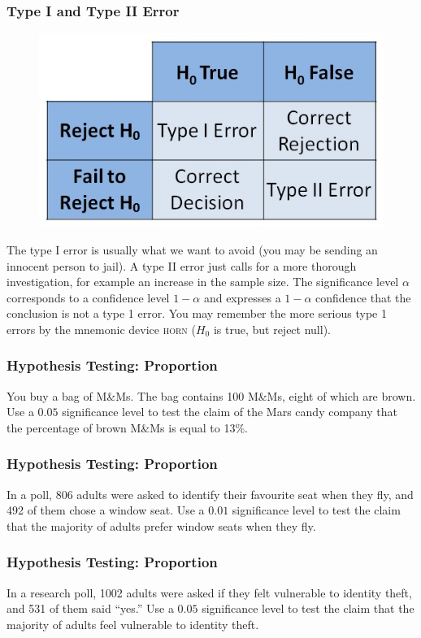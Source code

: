 \documentclass[xcolor=dvipsnames]{beamer}
\begin{document}
\begin{frame}
  \frametitle{Type I and Type II Error}
  \begin{figure}[h]
    \includegraphics[scale=0.5]{./diagrams/error.jpg}
  \end{figure}
  The type I error is usually what we want to avoid (you may be
  sending an innocent person to jail). A type II error just calls for
  a more thorough investigation, for example an increase in the sample
  size. The \alert{significance level} $\alpha$ corresponds to a
  confidence level $1-\alpha$ and expresses a $1-\alpha$ confidence
  that the conclusion is not a type 1 error. You may remember the more
  serious type 1 errors by the mnemonic device \textsc{horn} ($H_{0}$
  is true, but reject null).
\end{frame}

\begin{frame}
  \frametitle{Hypothesis Testing: Proportion}
  {\ubung} You buy a bag of M\&Ms. The bag contains 100 M\&Ms, eight
  of which are brown. Use a $0.05$ significance level to test the
  claim of the Mars candy company that the percentage of brown M\&Ms
  is equal to 13\%.
\end{frame}

\begin{frame}
  \frametitle{Hypothesis Testing: Proportion}
  {\ubung} In a poll, 806 adults were asked to identify their favourite seat
  when they fly, and 492 of them chose a window seat. Use a $0.01$
  significance level to test the claim that the majority of adults
  prefer window seats when they fly.
\end{frame}

\begin{frame}
  \frametitle{Hypothesis Testing: Proportion}
  {\ubung} In a research poll, 1002 adults were asked if they felt
  vulnerable to identity theft, and 531 of them said ``yes.'' Use a
  $0.05$ significance level to test the claim that the majority of
  adults feel vulnerable to identity theft.
\end{frame}
\end{document}

